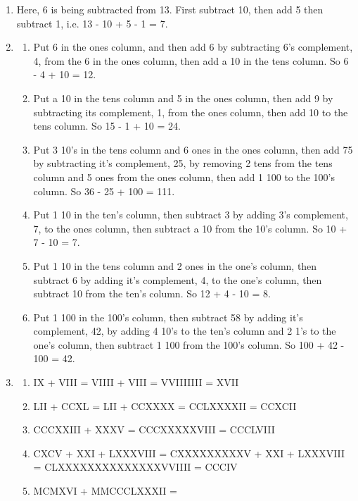 \documentclass[a4paper]{article}
\begin{document}
\begin{enumerate}
        \item Here, 6 is being subtracted from 13. First subtract 10, then add 5 
              then subtract 1, i.e. 13 - 10 + 5 - 1 = 7.

        \newpage

        \item
        \begin{enumerate}
            \item Put 6 in the ones column, and then add 6 by subtracting 6's 
                  complement, 4, from the 6 in the ones column, then add a 10 in the 
                  tens column. So 6 - 4 + 10 = 12.
            
            \item Put a 10 in the tens column and 5 in the ones column, then add 9 
                  by subtracting its complement, 1, from the ones column, then add 10 
                  to the tens column. So 15 - 1 + 10 = 24.

            \item Put 3 10's in the tens column and 6 ones in the ones column, then 
                  add 75 by subtracting it's complement, 25, by removing 2 tens 
                  from the tens column and 5 ones from the ones column, then add 
                  1 100 to the 100's column. So 36 - 25 + 100 = 111.
            
            \item Put 1 10 in the ten's column, then subtract 3 by adding 3's 
                  complement, 7, to the ones column, then subtract a 10 from the 
                  10's column. So 10 + 7 - 10 = 7.
            
            \item Put 1 10 in the tens column and 2 ones in the one's column, then 
                  subtract 6 by adding it's complement, 4, to the one's column, 
                  then subtract 10 from the ten's column. So 12 + 4 - 10 = 8.
            
            \item Put 1 100 in the 100's column, then subtract 58 by adding it's 
                  complement, 42, by adding 4 10's to the ten's column and 2 1's to 
                  the one's column, then subtract 1 100 from the 100's column. 
                  So 100 + 42 - 100 = 42.
        \end{enumerate}

        \item
        \begin{enumerate}
            \item IX + VIII = VIIII + VIII = VVIIIIIII = XVII
            \item LII + CCXL = LII + CCXXXX = CCLXXXXII = CCXCII
            \item CCCXXIII + XXXV = CCCXXXXXVIII = CCCLVIII
            \item CXCV + XXI + LXXXVIII = CXXXXXXXXXV + XXI + LXXXVIII = CLXXXXXXXXXXXXXXVVIIII = CCCIV
            \item MCMXVI + MMCCCLXXXII = 
        \end{enumerate}


\end{enumerate}
\end{document}
